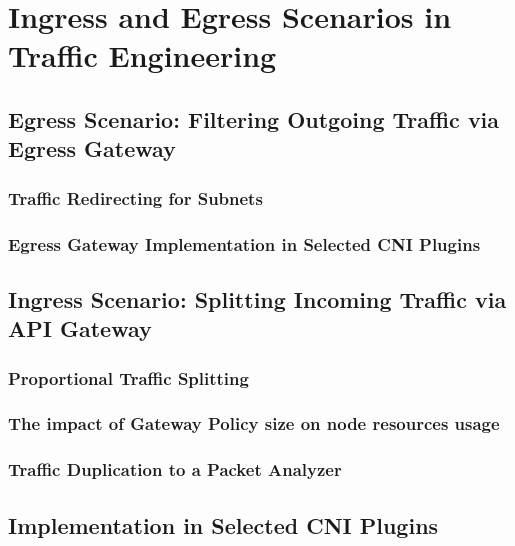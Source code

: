 \chapter{Ingress and Egress Scenarios in Traffic Engineering}
\label{cha:scenarios}


\section{Egress Scenario: Filtering Outgoing Traffic via Egress Gateway}
\label{sec:egress}



\subsection{Traffic Redirecting for Subnets}
\label{subsection:redirecting}

\subsection{Egress Gateway Implementation in Selected CNI Plugins}
\label{subsection:gateway}




\section{Ingress Scenario: Splitting Incoming Traffic via API Gateway}
\label{sec:ingress}




\subsection{Proportional Traffic Splitting}
\label{subsection:proportional_splitting}

\subsection{The impact of Gateway Policy size on node resources usage}
\label{subsection:impact}

\subsection{Traffic Duplication to a Packet Analyzer}
\label{subsection:duplication}

\section{Implementation in Selected CNI Plugins}
\label{sec:ingress_impl}


